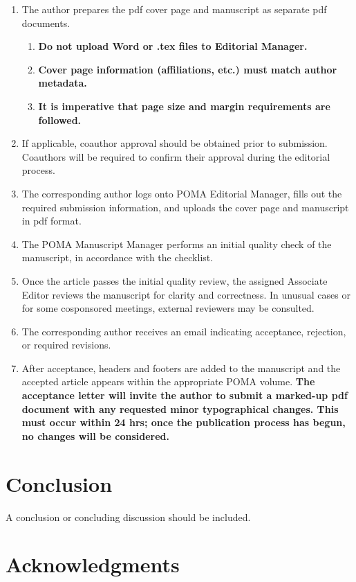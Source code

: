 \documentclass[12pt,letter]{article}
\begin{document}
\begin{enumerate}
	\item The author prepares the pdf cover page and manuscript as separate pdf documents.
\begin{enumerate}
	\item \textbf{Do not upload Word or .tex files to Editorial Manager.}
	\item \textbf{Cover page information (affiliations, etc.) must match author metadata.}
	\item \textbf{It is imperative that page size and margin requirements are followed.}
\end{enumerate}
	\item If applicable, coauthor approval should be obtained prior to submission. Coauthors will be required to confirm their approval during the editorial process. 
	\item The corresponding author logs onto POMA Editorial Manager, fills out the required submission information, and uploads the cover page and manuscript in pdf format.
	\item The POMA Manuscript Manager performs an initial quality check of the manuscript, in accordance with the checklist.
	\item Once the article passes the initial quality review, the assigned Associate Editor reviews the manuscript for clarity and correctness. In unusual cases or for some cosponsored meetings, external reviewers may be consulted.
	\item The corresponding author receives an email indicating acceptance, rejection, or required revisions.
	\item After acceptance, headers and footers are added to the manuscript and the accepted article appears within the appropriate POMA volume.  \textbf{The acceptance letter will invite the author to submit a marked-up pdf document with any requested minor typographical changes. This must occur within 24 hrs; once the publication process has begun, no changes will be considered.}
\end{enumerate}


\section{Conclusion}

A conclusion or concluding discussion should be included.


\section*{Acknowledgments}
\end{document}
